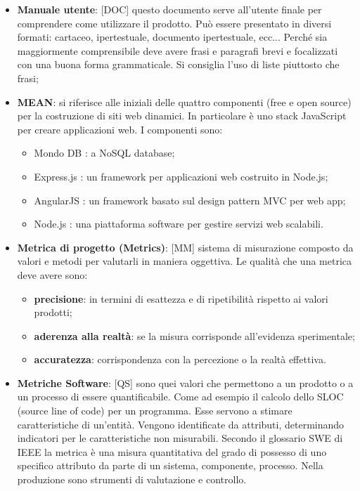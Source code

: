 \begin{itemize}


	\item \textbf{Manuale utente}: [DOC] questo documento serve all'utente finale per comprendere come utilizzare il prodotto. Può essere presentato in diversi formati: cartaceo, ipertestuale, documento ipertestuale, ecc... \newline
	Perché sia maggiormente comprensibile deve avere frasi e paragrafi brevi e focalizzati con una buona forma grammaticale. Si consiglia l'uso di liste piuttosto che frasi;


	\item \textbf{MEAN}: si riferisce alle iniziali delle quattro componenti (free e open source) per la costruzione di siti web dinamici. \newline
In particolare è uno stack JavaScript per creare applicazioni web. \newline
I componenti sono:
	\begin{itemize}
		\item Mondo DB : a NoSQL database;
		\item Express.js : un framework per applicazioni web costruito in Node.js;
		\item AngularJS : un framework basato sul design pattern MVC per web app;
		\item Node.js : una piattaforma software per gestire servizi web scalabili.
	\end{itemize}

	\item \textbf{Metrica di progetto (Metrics)}: [MM] sistema di misurazione composto da valori e metodi per valutarli in maniera oggettiva. Le qualità che una metrica deve avere sono:
		\begin{itemize}
			\item \textbf{precisione}: in termini di esattezza e di ripetibilità rispetto ai valori prodotti;
			\item \textbf{aderenza alla realtà}: se la misura corrisponde all'evidenza sperimentale;
			\item \textbf{accuratezza}: corrispondenza con la percezione o la realtà effettiva.
		\end{itemize}

	\item \textbf{Metriche Software}: [QS] sono quei valori che permettono a un prodotto o a un processo di essere quantificabile. Come ad esempio il calcolo dello SLOC (source line of code) per un programma. Esse servono a stimare caratteristiche di un'entità. Vengono identificate da attributi, determinando indicatori per le caratteristiche non misurabili. Secondo il glossario SWE di IEEE la metrica è una misura quantitativa del grado di possesso di uno specifico attributo da parte di un sistema, componente, processo. \newline
	Nella produzione sono strumenti di valutazione e controllo.


\end{itemize}
